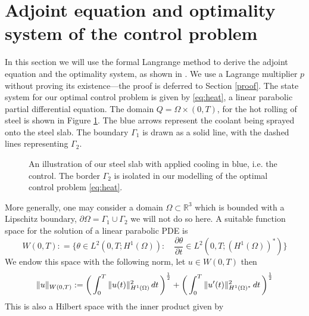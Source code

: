 \section{Adjoint equation and optimality system of the \mbox{control} problem}

In this section we will use the formal Langrange method to derive the adjoint equation and the optimality system, as shown in \cite{optimalControl}. We use a Lagrange multiplier $p$ without proving its existence---the proof is deferred to Section \ref{proof}. The state system for our optimal control problem is given by \eqref{eq:heat}, a linear parabolic partial differential equation.
The domain $Q = \Omega \times (0,T)$, for the hot rolling of steel is shown in Figure \ref{fig:steel_slab}. The blue arrows represent the coolant being sprayed onto the steel slab. The boundary $\Gamma_1$ is drawn as a solid line, with the dashed lines representing $\Gamma_2$. 
\begin{figure}
    \centering
    
    \caption{An illustration of our steel slab with applied cooling in blue, i.e. the control. The border $\Gamma_2$ is isolated in our modelling of the optimal control problem \eqref{eq:heat}.}
    \label{fig:steel_slab}
\end{figure}

More generally, one may consider a domain $\Omega \subset \mathbb{R}^3$ which is bounded with a Lipschitz boundary, $\partial \Omega = \Gamma_1 \cup \Gamma_2$ we will not do so here. A suitable function space for the solution of a linear parabolic PDE is 
\begin{equation}
    \label{eq:funcSpace}
    W(0,T) : = \{ \theta \in L^2(0,T;H^1(\Omega)) : \quad \frac{\partial \theta}{\partial t} \in L^2(0,T;(H^1(\Omega))^{*}) \}
\end{equation}
We endow this space with the following norm, let $u \in W(0,T)$ then 
\begin{equation*}
    \|u\|_{W(0,T)} := \bigg (\int_{0}^T\|u(t)\|^2_{H^{1}(\Omega)}\mathop{dt} \bigg ) ^{\frac{1}{2}} + \bigg (\int_{0}^T\|u'(t)\|^2_{H^{1}(\Omega)^{*}}\mathop{dt} \bigg ) ^{\frac{1}{2}}
\end{equation*}
This is also a Hilbert space with the inner product given by 

